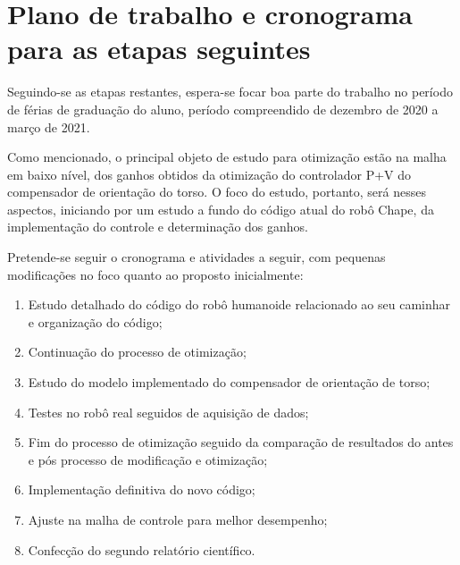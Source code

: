 \section{Plano de trabalho e cronograma para as etapas seguintes}

Seguindo-se as etapas restantes, espera-se focar boa parte do trabalho no período de férias de graduação do aluno, período compreendido de dezembro de 2020 a março de 2021. 

Como mencionado, o principal objeto de estudo para otimização estão na malha em baixo nível, dos ganhos obtidos da otimização do controlador P+V do compensador de orientação do torso. O foco do estudo, portanto, será nesses aspectos, iniciando por um estudo a fundo do código atual do robô Chape, da implementação do controle e determinação dos ganhos.

Pretende-se seguir o cronograma e atividades a seguir, com pequenas modificações no foco quanto ao proposto inicialmente:

\begin{enumerate}[A]
\item{Estudo detalhado do código do robô humanoide relacionado ao seu caminhar e organização do código;}
\item{Continuação do processo de otimização;}
\item{Estudo do modelo implementado do compensador de orientação de torso;}
\item{Testes no robô real seguidos de aquisição de dados;}
\item{Fim do processo de otimização seguido da comparação de resultados do antes e pós processo de modificação e otimização;}
\item{Implementação definitiva do novo código;}
\item{Ajuste na malha de controle para melhor desempenho;}
\item{Confecção do segundo relatório científico.}
\end{enumerate}

